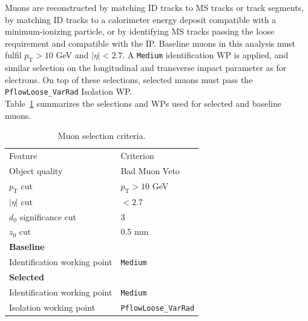 Muons are reconstructed by matching ID tracks to MS tracks or track segments, by matching ID tracks to
a calorimeter energy deposit compatible with a minimum-ionizing particle, or by identifying MS tracks
passing the loose requirement and compatible with the IP. Baseline muons in this analysis must fulfil $p_{\mathrm{T}}>10$ GeV and $|\eta|<2.7$. A \texttt{Medium} identification WP is applied, and similar selection on the longitudinal and transverse impact parameter as for electrons. 
On top of these selections, selected muons must pass the \texttt{PflowLoose\_VarRad} Isolation WP. \\
Table~\ref{tab:object:muon} summarizes the selections and WPs used for selected and baseline muons. 



\begin{table}[ht]
  \caption{Muon selection criteria.}%
  \label{tab:object:muon}
  \centering
  \begin{tabular}[ht]{ll}
    \toprule
    Feature & Criterion \\
    Object quality & Bad Muon Veto \\
    $p_{\mathrm{T}}$ cut & $p_{\mathrm{T}}>10$ GeV \\
    $|\eta|$ cut & $< 2.7$ \\
    $d_{0}$ significance cut & 3 \\
    $z_{0}$ cut & 0.5 mm \\
    \midrule
    \midrule
    \textbf{Baseline} &\\
    \midrule
    Identification working point & \texttt{Medium} \\
    \midrule
    \textbf{Selected} &\\
    \midrule
    Identification working point & \texttt{Medium} \\
    Isolation working point & \texttt{PflowLoose\_VarRad}\\
    \bottomrule
  \end{tabular} 
\end{table}